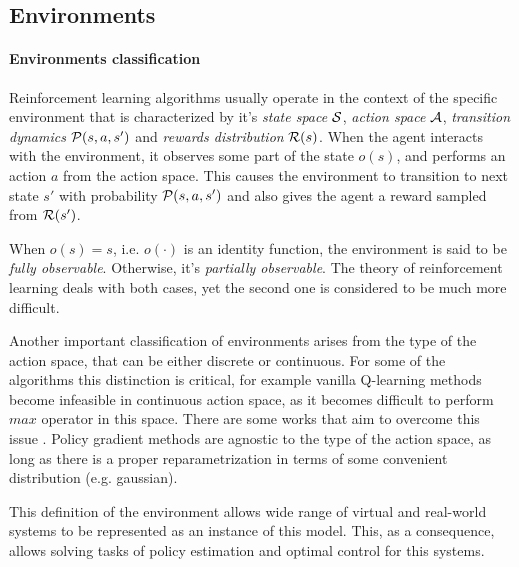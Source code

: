 \subsection{Environments}


\paragraph{Environments classification}
Reinforcement learning algorithms usually operate in the context of the specific
environment that is characterized by it's \emph{state space} $\mathcal{S}$,
\emph{action space} $\mathcal{A}$, \emph{transition dynamics} $\mathcal{P}(s, a, s')$ and
\emph{rewards distribution} $\mathcal{R}(s)$.
When the agent interacts with the environment, it observes some part of the state $o(s)$,
and performs an action $a$ from the action space. This causes the environment to transition to
next state $s'$ with probability $\mathcal{P}(s, a, s')$ and also gives the agent a reward sampled
from $\mathcal{R}(s')$.

When $o(s) = s$, i.e. $o(\cdot)$ is an identity function, the environment is said to be
\emph{fully observable}. Otherwise, it's \emph{partially observable}. The theory of reinforcement
learning deals with both cases, yet the second one is considered to be much more difficult.

Another important classification of environments arises from the type of the action space,
that can be either discrete or continuous. For some of the algorithms this
distinction is critical, for example vanilla Q-learning methods become infeasible in
continuous action space, as it becomes difficult to perform $max$ operator in this space.
There are some works that aim to overcome this issue \cite{gu2016continuous}.
Policy gradient methods are agnostic to the type of the action space, as long as there is
a proper reparametrization in terms of some convenient distribution (e.g. gaussian).

This definition of the environment allows wide range of virtual and real-world systems to be
represented as an instance of this model. This, as a consequence, allows solving tasks of policy
estimation and optimal control for this systems.

